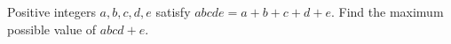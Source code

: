 Positive integers $a,b,c,d,e$ satisfy $abcde=a+b+c+d+e$. Find the maximum possible value of $abcd+e$.
